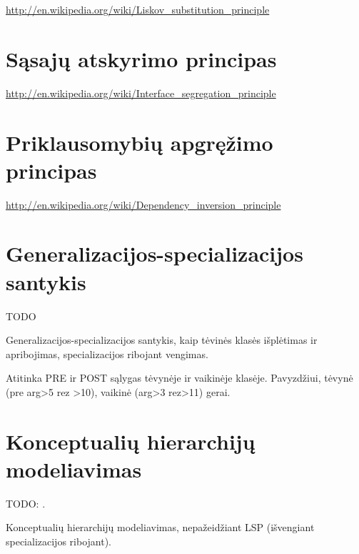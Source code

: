 \url{http://en.wikipedia.org/wiki/Liskov_substitution_principle}

\section{Sąsajų atskyrimo principas}

\url{http://en.wikipedia.org/wiki/Interface_segregation_principle}

\section{Priklausomybių apgręžimo principas}

\url{http://en.wikipedia.org/wiki/Dependency_inversion_principle}

\section{Generalizacijos-specializacijos santykis}

TODO

Generalizacijos-specializacijos santykis, kaip tėvinės klasės išplėtimas
ir apribojimas, specializacijos ribojant vengimas.

Atitinka PRE ir POST sąlygas tėvynėje ir vaikinėje klasėje.  
Pavyzdžiui, tėvynė (pre arg>5 rez >10), vaikinė (arg>3 rez>11) gerai.

\section{Konceptualių hierarchijų modeliavimas}

TODO: \cite{Grosberg1997design}.

Konceptualių hierarchijų modeliavimas, nepažeidžiant LSP
(išvengiant specializacijos ribojant).
